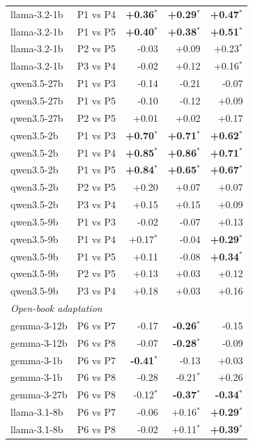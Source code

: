 \begin{table}[p]
\begin{tabular}{llrrr}
llama-3.2-1b & P1 vs P4 & \textbf{+0.36$^{*}$} & \textbf{+0.29$^{*}$} & \textbf{+0.47$^{*}$} \\
llama-3.2-1b & P1 vs P5 & \textbf{+0.40$^{*}$} & \textbf{+0.38$^{*}$} & \textbf{+0.51$^{*}$} \\
llama-3.2-1b & P2 vs P5 & -0.03 & +0.09 & +0.23$^{*}$ \\
llama-3.2-1b & P3 vs P4 & -0.02 & +0.12 & +0.16$^{*}$ \\
qwen3.5-27b & P1 vs P3 & -0.14 & -0.21 & -0.07 \\
qwen3.5-27b & P1 vs P5 & -0.10 & -0.12 & +0.09 \\
qwen3.5-27b & P2 vs P5 & +0.01 & +0.02 & +0.17 \\
qwen3.5-2b & P1 vs P3 & \textbf{+0.70$^{*}$} & \textbf{+0.71$^{*}$} & \textbf{+0.62$^{*}$} \\
qwen3.5-2b & P1 vs P4 & \textbf{+0.85$^{*}$} & \textbf{+0.86$^{*}$} & \textbf{+0.71$^{*}$} \\
qwen3.5-2b & P1 vs P5 & \textbf{+0.84$^{*}$} & \textbf{+0.65$^{*}$} & \textbf{+0.67$^{*}$} \\
qwen3.5-2b & P2 vs P5 & +0.20 & +0.07 & +0.07 \\
qwen3.5-2b & P3 vs P4 & +0.15 & +0.15 & +0.09 \\
qwen3.5-9b & P1 vs P3 & -0.02 & -0.07 & +0.13 \\
qwen3.5-9b & P1 vs P4 & +0.17$^{*}$ & -0.04 & \textbf{+0.29$^{*}$} \\
qwen3.5-9b & P1 vs P5 & +0.11 & -0.08 & \textbf{+0.34$^{*}$} \\
qwen3.5-9b & P2 vs P5 & +0.13 & +0.03 & +0.12 \\
qwen3.5-9b & P3 vs P4 & +0.18 & +0.03 & +0.16 \\
\midrule \multicolumn{5}{l}{\textit{Open-book adaptation}} \\ \midrule
gemma-3-12b & P6 vs P7 & -0.17 & \textbf{-0.26$^{*}$} & -0.15 \\
gemma-3-12b & P6 vs P8 & -0.07 & \textbf{-0.28$^{*}$} & -0.09 \\
gemma-3-1b & P6 vs P7 & \textbf{-0.41$^{*}$} & -0.13 & +0.03 \\
gemma-3-1b & P6 vs P8 & -0.28 & -0.21$^{*}$ & +0.26 \\
gemma-3-27b & P6 vs P8 & -0.12$^{*}$ & \textbf{-0.37$^{*}$} & \textbf{-0.34$^{*}$} \\
llama-3.1-8b & P6 vs P7 & -0.06 & +0.16$^{*}$ & \textbf{+0.29$^{*}$} \\
llama-3.1-8b & P6 vs P8 & -0.02 & +0.11$^{*}$ & \textbf{+0.39$^{*}$} \\

\end{tabular}
\end{table}
